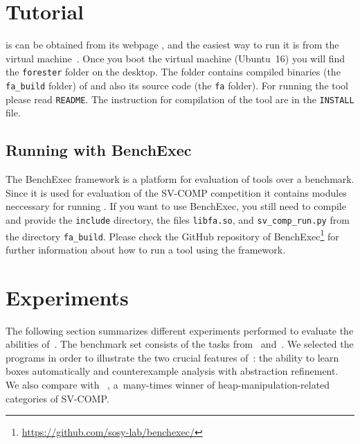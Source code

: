 {%


\section{Tutorial}\label{sec:tutorial}

\forester is can be obtained from its webpage \cite{foresterweb}, and the
easiest way to run it is from the virtual machine~\cite{zenodo}.
Once you boot the virtual machine (Ubuntu~16) you will find the \texttt{forester} folder
on the desktop.
The folder contains compiled binaries (the \texttt{fa\_build} folder) of \forester and also its source code (the \texttt{fa} folder).
For running the tool please read \texttt{README}.
The instruction for compilation of the tool are in the \texttt{INSTALL} file.

\subsection{Running \forester{} with BenchExec}

The BenchExec framework is a platform for evaluation of tools over a benchmark.
Since it is used for evaluation of the SV-COMP competition it contains modules neccessary
for running \forester.
If you want to use BenchExec, you still need to compile \forester{} and provide the \texttt{include}
directory, the files \texttt{libfa.so}, and \texttt{sv\_comp\_run.py} from the directory \texttt{fa\_build}.
Please check the GitHub repository of BenchExec\footnote{\url{https://github.com/sosy-lab/benchexec/}} for further
information about how to run a tool using the framework.



\section{Experiments}\label{sec:exps}

The following section summarizes different experiments performed to evaluate
the abilities of~\forester{}.
The benchmark set consists of the tasks from~\cite{boxes13} and~\cite{vmcai17}.
We selected the programs in order to illustrate the two crucial features
of~\forester: the ability to learn boxes
automatically and counterexample analysis with abstraction refinement.
We also compare with \predator~\cite{predator11,dudka13sas}, a~many-times winner of
heap-manipulation-related categories of SV-COMP.

}
